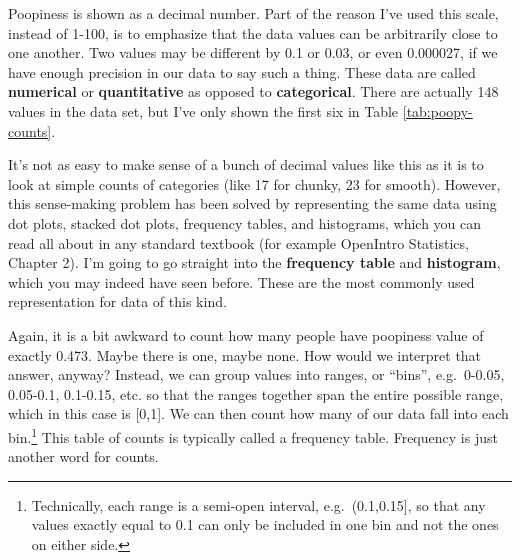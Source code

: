 \documentclass[
  openany]{book}
\begin{document}
Poopiness is shown as a decimal number. Part of the reason I've used this scale, instead of 1-100, is to emphasize that the data values can be arbitrarily close to one another. Two values may be different by 0.1 or 0.03, or even 0.000027, if we have enough precision in our data to say such a thing. These data are called \textbf{numerical} or \textbf{quantitative} as opposed to \textbf{categorical}. There are actually 148 values in the data set, but I've only shown the first six in Table \ref{tab:poopy-counts}.

It's not as easy to make sense of a bunch of decimal values like this as it is to look at simple counts of categories (like 17 for chunky, 23 for smooth). However, this sense-making problem has been solved by representing the same data using dot plots, stacked dot plots, frequency tables, and histograms, which you can read all about in any standard textbook (for example OpenIntro Statistics, Chapter 2). I'm going to go straight into the \textbf{frequency table} and \textbf{histogram}, which you may indeed have seen before. These are the most commonly used representation for data of this kind.

Again, it is a bit awkward to count how many people have poopiness value of exactly 0.473. Maybe there is one, maybe none. How would we interpret that answer, anyway? Instead, we can group values into ranges, or ``bins'', e.g.~0-0.05, 0.05-0.1, 0.1-0.15, etc. so that the ranges together span the entire possible range, which in this case is {[}0,1{]}. We can then count how many of our data fall into each bin.\footnote{Technically, each range is a semi-open interval, e.g.~(0.1,0.15{]}, so that any values exactly equal to 0.1 can only be included in one bin and not the ones on either side.} This table of counts is typically called a frequency table. Frequency is just another word for counts.
\end{document}
